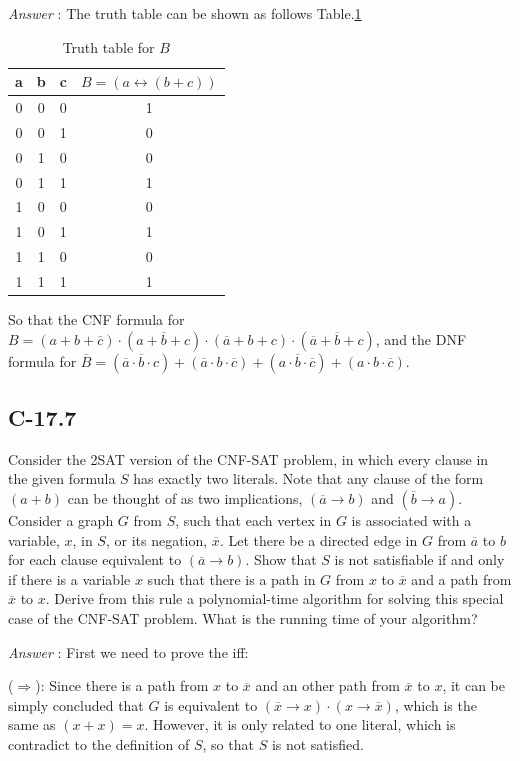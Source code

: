 \documentclass[11pt]{article}
\begin{document}
\noindent\emph{Answer} : The truth table can be shown as follows Table.\ref{tab:tab1}
\begin{table}[!hbp]
	\centering
	\caption{Truth table for $B$}
	\begin{tabular}{c|c|c|c}
		\hline 
		\hline
		a	&b	&c	&$B=(a\leftrightarrow(b+c))$\\
		\hline
		0	&0	&0	&1	\\
		\hline
		0	&0	&1	&0	\\
		\hline
		0	&1	&0	&0	\\
		\hline
		0	&1	&1	&1	\\
		\hline
		1	&0	&0	&0	\\
		\hline
		1	&0	&1	&1	\\
		\hline
		1	&1	&0	&0	\\
		\hline
		1	&1	&1	&1	\\
		\hline
		\hline
		\end{tabular}
		\label{tab:tab1}
\end{table}

So that the CNF formula for $B=(a+b+\overline{c})\cdot(a+\overline{b}+c)\cdot(\overline{a}+b+c)\cdot(\overline{a}+\overline{b}+c)$, and the DNF formula for $\overline{B}=(\overline{a}\cdot\overline{b}\cdot c)+(\overline{a}\cdot b\cdot\overline{c})+(a\cdot\overline{b}\cdot\overline{c})+(a\cdot b\cdot\overline{c})$.

\subsection{C-17.7}
Consider the 2SAT version of the CNF-SAT problem, in which every clause in the given formula $S$ has exactly two literals. Note that any clause of the form $(a + b)$ can be thought of as two implications, $(\overline{a} \rightarrow b)$ and $(\overline{b} \rightarrow a)$. Consider a graph $G$ from $S$, such that each vertex in $G$ is associated with a variable, $x$, in $S$, or its negation, $\overline{x}$. Let there be a directed edge in $G$ from $\overline{a}$ to $b$ for each clause equivalent to $(\overline{a} \rightarrow b)$. Show that $S$ is not satisfiable if and only if there is a variable $x$ such that there is a path in $G$ from $x$ to $\overline{x}$ and a path from $\overline{x}$ to $x$. Derive from this rule a polynomial-time algorithm for solving this special case of the CNF-SAT problem. What is the running time of your algorithm?

\noindent\emph{Answer} : 
	First we need to prove the iff:
	
	($\Longrightarrow$): Since there is a path from $x$ to $\overline{x}$ and an other path from $\overline{x}$ to $x$, it can be simply concluded that $G$ is equivalent to $(\overline{x}\rightarrow x)\cdot(x\rightarrow\overline{x})$, which is the same as $(x+x)=x$. However, it is only related to one literal, which is contradict to the definition of $S$, so that $S$ is not satisfied.
	
\end{document}
